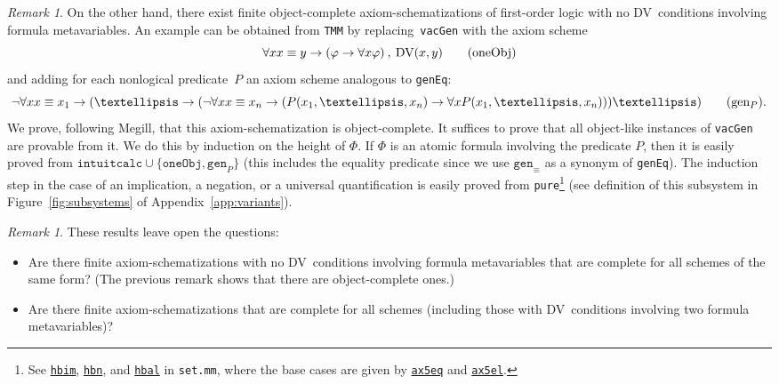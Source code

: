\documentclass[11pt]{article}
\newcommand*{\comma}{\:,\:}
\renewcommand*{\phi}{\varphi}
\DeclareMathOperator{\DV}{DV}
\theoremstyle{plain}
\theoremstyle{definition}
\theoremstyle{remark}
\newtheorem{remark}[theorem]{Remark}
\begin{document}
\begin{remark}
On the other hand, there exist finite object-complete axiom-schematizations of first-order logic
with no DV~conditions involving formula metavariables.
An example can be obtained from \texttt{TMM} by replacing~\texttt{vacGen} with the axiom scheme
\begin{equation}
\forall x x \equiv y \to (\phi \to \forall x \phi) \comma \DV(x, y) \tag{\texttt{oneObj}}
\end{equation}
and adding for each nonlogical predicate~$P$ an axiom scheme analogous to \texttt{genEq}:
\begin{equation*}
\neg \forall x x \equiv x_1 \to ( \dots \to (\neg \forall x x \equiv x_n \to (P(x_1, \dots, x_n) \to \forall x P(x_1, \dots, x_n))) \dots) \tag{\texttt{gen$_P$}}.
\end{equation*}
We prove, following Megill, that this axiom-schematization is object-complete.
It suffices to prove that all object-like instances of \texttt{vacGen} are provable from it.
We do this by induction on the height of $\Phi$.
If $\Phi$ is an atomic formula involving the predicate $P$, then it is easily proved from
$\texttt{intuitcalc} \cup \{ \texttt{oneObj}, \texttt{gen}_P \}$ (this includes the equality
predicate since we use $\texttt{gen}_\equiv$ as a synonym of \texttt{genEq}).
The induction step in the case of an implication, a negation, or a universal quantification is
easily proved from \texttt{pure}\footnote{See
\href{https://us.metamath.org/mpeuni/hbim.html}{\texttt{hbim}},
\href{https://us.metamath.org/mpeuni/hbn.html}{\texttt{hbn}}, and
\href{https://us.metamath.org/mpeuni/hbal.html}{\texttt{hbal}} in \texttt{set.mm}, where the base
cases are given by
\href{https://us.metamath.org/mpeuni/ax5eq.html}{\texttt{ax5eq}} and
\href{https://us.metamath.org/mpeuni/ax5el.html}{\texttt{ax5el}}.} (see definition of this subsystem
in Figure~\ref{fig:subsystems} of Appendix~\ref{app:variants}).
\end{remark}

\begin{remark}
These results leave open the questions:
\begin{itemize}
\item
Are there finite axiom-schematizations with no DV~conditions involving formula metavariables that
are complete for all schemes of the same form?
(The previous remark shows that there are object-complete ones.)
\item
Are there finite axiom-schematizations that are complete for all schemes (including those with
DV~conditions involving two formula metavariables)?
\end{itemize}
\end{remark}
\end{document}
